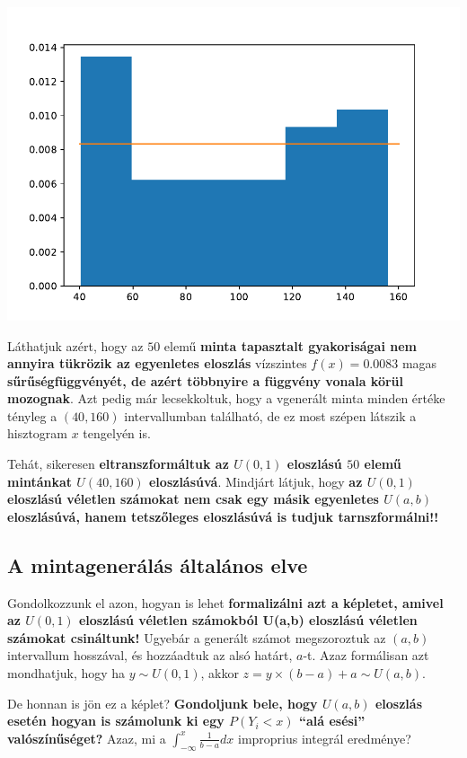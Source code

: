 \documentclass[
]{book}
\begin{document}
\includegraphics{_main_files/figure-latex/unnamed-chunk-206-5.pdf}

Láthatjuk azért, hogy az \(50\) elemű \textbf{minta tapasztalt gyakoriságai nem annyira tükrözik az egyenletes eloszlás} vízszintes \(f(x) = 0.0083\) magas \textbf{sűrűségfüggvényét, de azért többnyire a függvény vonala körül mozognak}. Azt pedig már lecsekkoltuk, hogy a vgenerált minta minden értéke tényleg a \((40,160)\) intervallumban található, de ez most szépen látszik a hisztogram \(x\) tengelyén is.

Tehát, sikeresen \textbf{eltranszformáltuk az \(U(0,1)\) eloszlású \(50\) elemű mintánkat \(U(40,160)\) eloszlásúvá}. Mindjárt látjuk, hogy \textbf{az \(U(0,1)\) eloszlású véletlen számokat nem csak egy másik egyenletes \(U(a,b)\) eloszlásúvá, hanem tetszőleges eloszlásúvá is tudjuk tarnszformálni!!}

\subsection{A mintagenerálás általános elve}\label{a-mintageneruxe1luxe1s-uxe1ltaluxe1nos-elve}

Gondolkozzunk el azon, hogyan is lehet \textbf{formalizálni azt a képletet, amivel az \(U(0,1)\) eloszlású véletlen számokból U(a,b) eloszlású véletlen számokat csináltunk!}
Ugyebár a generált számot megszoroztuk az \((a,b)\) intervallum hosszával, és hozzáadtuk az alsó határt, \(a\)-t. Azaz formálisan azt mondhatjuk, hogy ha \(y \sim U(0,1)\), akkor \(z = y \times (b-a) + a \sim U(a,b)\).

De honnan is jön ez a képlet? \textbf{Gondoljunk bele, hogy \(U(a,b)\) eloszlás esetén hogyan is számolunk ki egy \(P(Y_i < x)\) ``alá esési'' valószínűséget?} Azaz, mi a \(\int_{-\infty}^x{\frac{1}{b-a}}dx\) improprius integrál eredménye?
\end{document}

